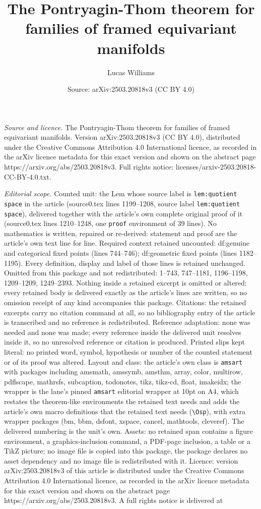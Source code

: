 \documentclass[10pt,a4paper]{amsart}
\title[The Pontryagin-Thom theorem for families of framed equivaria]{The Pontryagin-Thom theorem for families of framed equivariant manifolds}
\author{Lucas Williams}
\date{Source: arXiv:2503.20818v3 (CC BY 4.0)}
\begin{document}
\maketitle

\noindent\emph{Source and licence.} The Pontryagin-Thom theorem for families of framed equivariant manifolds. Version arXiv:2503.20818v3 (CC BY 4.0), distributed under the Creative Commons Attribution 4.0 International licence, as recorded in the arXiv licence metadata for this exact version and shown on the abstract page https://arxiv.org/abs/2503.20818v3. Full rights notice: licenses/arxiv-2503.20818-CC-BY-4.0.txt.\par\smallskip

\noindent\textit{Editorial scope.} Counted unit: the Lem whose source label is \texttt{lem:quotient space} in the article (source0.tex lines 1199--1208, source label \texttt{lem:quotient space}), delivered together with the article's own complete original proof of it (source0.tex lines 1210--1248, one \texttt{proof} environment of 39 lines). No mathematics is written, repaired or re-derived: statement and proof are the article's own text line for line. Required context retained uncounted: df:genuine and categorical fixed points (lines 744--746); df:geometric fixed points (lines 1182--1195). Every definition, display and label of those lines is retained unchanged. Omitted from this package and not redistributed: 1--743, 747--1181, 1196--1198, 1209--1209, 1249--2393. Nothing inside a retained excerpt is omitted or altered: every retained body is delivered exactly as the article's lines are written, so no omission receipt of any kind accompanies this package. Citations: the retained excerpts carry no citation command at all, so no bibliography entry of the article is transcribed and no reference is redistributed. Reference adaptation: none was needed and none was made; every reference inside the delivered unit resolves inside it, so no unresolved reference or citation is produced. Printed slips kept literal: no printed word, symbol, hypothesis or number of the counted statement or of its proof was altered. Layout and class: the article's own class is \texttt{amsart} with packages including amsmath, amssymb, amsthm, array, color, multirow, pdflscape, mathrsfs, subcaption, todonotes, tikz, tikz-cd, float, imakeidx; the wrapper is the lane's pinned \texttt{amsart} editorial wrapper at 10pt on A4, which restates the theorem-like environments the retained text needs and adds the article's own macro definitions that the retained text needs (\texttt{\textbackslash Osp}), with extra wrapper packages (bm, bbm, dsfont, xspace, cancel, mathtools, cleveref). The delivered numbering is the unit's own. Assets: no retained span contains a figure environment, a graphics-inclusion command, a PDF-page inclusion, a table or a TikZ picture; no image file is copied into this package, the package declares no asset dependency and no image file is redistributed with it. Licence: version arXiv:2503.20818v3 of this article is distributed under the Creative Commons Attribution 4.0 International licence, as recorded in the arXiv licence metadata for this exact version and shown on the abstract page https://arxiv.org/abs/2503.20818v3. A full rights notice is delivered at 
\end{document}
